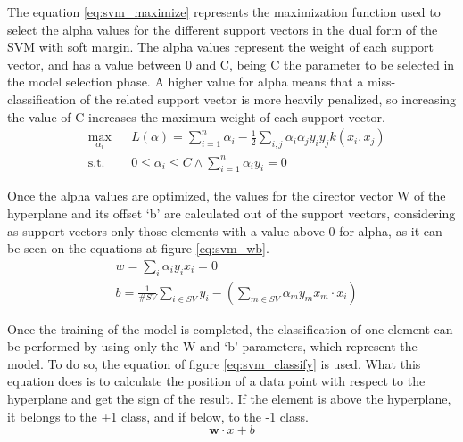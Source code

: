 \documentclass[10pt, journal]{IEEEtran}
\begin{document}
The equation \ref{eq:svm_maximize} represents the maximization function used to select the alpha values for the different support vectors in the dual form of the SVM with soft margin. The alpha values represent the weight of each support vector, and has a value between 0 and C, being C the parameter to be selected in the model selection phase. A higher value for alpha means that a miss-classification of the related support vector is more heavily penalized, so increasing the value of C increases the maximum weight of each support vector.\\
\begin{equation}
	\begin{aligned}
		& \underset{\alpha_i}{\text{max}}
		& & L(\alpha) = \sum_{i=1}^{n}{\alpha_i} - \frac{1}{2}\sum_{i,j}\alpha_i\alpha_j y_i y_j k(x_i,x_j)\\
		& \text{s.t.}
		& & 0 \le \alpha_i \le C \land \sum_{i=1}^n{\alpha_i y_i} = 0
	\end{aligned}
	\label{eq:svm_maximize}
\end{equation}

Once the alpha values are optimized, the values for the director vector W of the hyperplane and its offset `b' are calculated out of the support vectors, considering as support vectors only those elements with a value above 0 for alpha, as it can be seen on the equations at figure \ref{eq:svm_wb}.\\
\begin{equation}
	\begin{aligned}
		&w = \sum_i{\alpha_iy_ix_i} = 0\\
		&b = \frac{1}{\#SV}\sum_{i \in SV}{y_i-(\sum_{m \in SV}{\alpha_my_mx_m\cdot x_i})}
	\end{aligned}
	\label{eq:svm_wb}
\end{equation}

Once the training of the model is completed, the classification of one element can be performed by using only the W and `b' parameters, which represent the model. To do so, the equation of figure \ref{eq:svm_classify} is used. What this equation does is to calculate the position of a data point with respect to the hyperplane and get the sign of the result. If the element is above the hyperplane, it belongs to the +1 class, and if below, to the -1 class.
\begin{equation}
	\mathbf{w}\cdot x + b
	\label{eq:svm_classify}
\end{equation}
\end{document}
